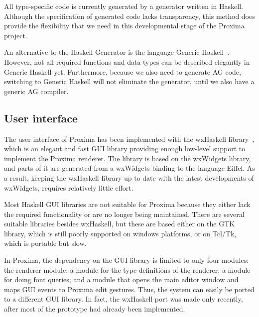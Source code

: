 All type-specific code is currently generated by a generator written in Haskell. Although the specification of generated code lacks transparency, this method does provide the flexibility that we need in this developmental stage of the Proxima project. 

An alternative to the Haskell Generator is the language Generic Haskell~\cite{loeh04exploringGH}. However, not all required functions and data types can be described elegantly in Generic Haskell yet. Furthermore, because we also need to generate AG code, switching to Generic Haskell will not eliminate the generator, until we also have a generic AG compiler.


\subsection{User interface}

The user interface of Proxima has been implemented with the wxHaskell library~\cite{leijen04wxHaskell}, which is  an elegant and fast GUI library providing enough low-level support to implement the Proxima renderer. The library is based on the wxWidgets library, and parts of it are generated from a wxWidgets binding to the language Eiffel. As a result, keeping the wxHaskell library up to date with the latest developments of wxWidgets, requires relatively little effort. 

Most Haskell GUI libraries are not suitable for Proxima because they either lack the required functionality or are no longer being maintained. There are several suitable libraries besides wxHaskell, but these are based either on the GTK library, which is still poorly supported on windows platforms, or on Tcl/Tk, which is portable but slow.

In Proxima, the dependency on the GUI library is limited to only four modules: the renderer module; a module for the type definitions of the renderer; a module for doing font queries; and a module that opens the main editor window and maps GUI events to Proxima edit gestures. Thus, the system can easily be ported to  a different GUI library. In fact, the wxHaskell port was made only recently, after most of the prototype had already been implemented.



